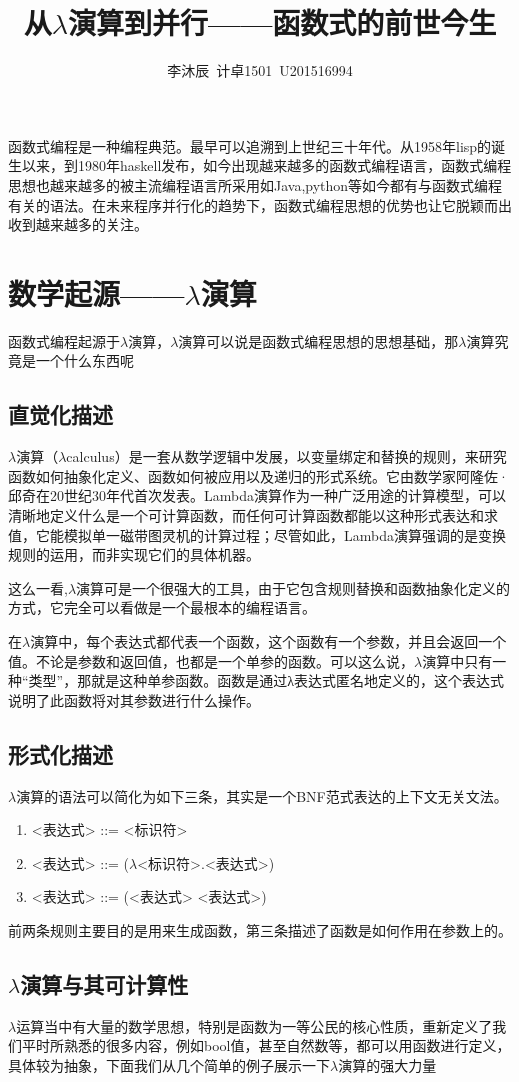 \documentclass{article}
\author{李沐辰\ 计卓1501\ U201516994}
\title{从$\lambda$演算到并行——函数式的前世今生}
\date{}
\begin{document}
	\maketitle
	函数式编程是一种编程典范。最早可以追溯到上世纪三十年代。从1958年lisp的诞生以来，到1980年haskell发布，如今出现越来越多的函数式编程语言，函数式编程思想也越来越多的被主流编程语言所采用如Java,python等如今都有与函数式编程有关的语法。在未来程序并行化的趋势下，函数式编程思想的优势也让它脱颖而出收到越来越多的关注。
	\section{数学起源——$\lambda$演算}
	函数式编程起源于$\lambda$演算，$\lambda$演算可以说是函数式编程思想的思想基础，那$\lambda$演算究竟是一个什么东西呢
	\subsection{直觉化描述}
	$\lambda$演算（$\lambda$calculus）是一套从数学逻辑中发展，以变量绑定和替换的规则，来研究函数如何抽象化定义、函数如何被应用以及递归的形式系统。它由数学家阿隆佐·邱奇在20世纪30年代首次发表。Lambda演算作为一种广泛用途的计算模型，可以清晰地定义什么是一个可计算函数，而任何可计算函数都能以这种形式表达和求值，它能模拟单一磁带图灵机的计算过程；尽管如此，Lambda演算强调的是变换规则的运用，而非实现它们的具体机器。
	
	这么一看,$\lambda$演算可是一个很强大的工具，由于它包含规则替换和函数抽象化定义的方式，它完全可以看做是一个最根本的编程语言。
	
	在$\lambda$演算中，每个表达式都代表一个函数，这个函数有一个参数，并且会返回一个值。不论是参数和返回值，也都是一个单参的函数。可以这么说，$\lambda$演算中只有一种“类型”，那就是这种单参函数。函数是通过λ表达式匿名地定义的，这个表达式说明了此函数将对其参数进行什么操作。
	\subsection{形式化描述}
	$\lambda$演算的语法可以简化为如下三条，其实是一个BNF范式表达的上下文无关文法。
	\begin{enumerate}
	\item <表达式> ::= <标识符>
	\item <表达式> ::= ($\lambda$<标识符>.<表达式>)
	\item <表达式> ::= (<表达式> <表达式>)
	\end{enumerate}
	前两条规则主要目的是用来生成函数，第三条描述了函数是如何作用在参数上的。
	\subsection{$\lambda$演算与其可计算性}
	$\lambda$运算当中有大量的数学思想，特别是函数为一等公民的核心性质，重新定义了我们平时所熟悉的很多内容，例如bool值，甚至自然数等，都可以用函数进行定义，具体较为抽象，下面我们从几个简单的例子展示一下$\lambda$演算的强大力量
	
\end{document}
